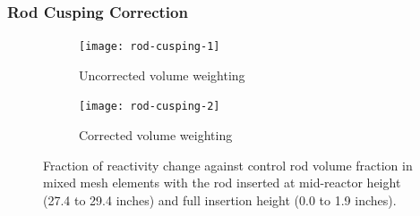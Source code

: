 \begin{frame}[noframenumbering]
  \frametitle{Rod Cusping Correction}
  \begin{figure}[t]
      \centering
      \begin{subfigure}[t]{.49\textwidth}
          \centering
          \texttt{[image: rod-cusping-1]}
          \caption{Uncorrected volume weighting}
          \label{fig:rod-cusping-1}
      \end{subfigure}
      \hfill
      \begin{subfigure}[t]{.49\textwidth}
          \centering
          \texttt{[image: rod-cusping-2]}
          \caption{Corrected volume weighting}
          \label{fig:rod-cusping-2}
      \end{subfigure}
      \caption{Fraction of reactivity change against control rod volume fraction in mixed mesh
      elements with the rod inserted at mid-reactor height (27.4 to 29.4 inches) and full insertion
      height (0.0 to 1.9 inches).}
      \label{fig:rod-cusping}
  \end{figure}
\end{frame}

